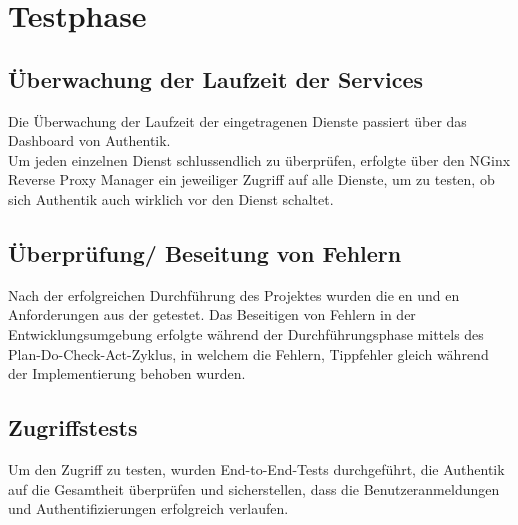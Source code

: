 \section{Testphase}
\label{sec:Testphase}

\subsection{Überwachung der Laufzeit der Services}
\label{sec:Überwachung der Laufzeit der Services}
Die Überwachung der Laufzeit der eingetragenen Dienste passiert über das Dashboard von Authentik.
\\Um jeden einzelnen Dienst schlussendlich zu überprüfen, erfolgte über den NGinx Reverse Proxy Manager ein jeweiliger Zugriff auf alle Dienste, um 
zu testen, ob sich Authentik auch wirklich vor den Dienst schaltet.

\subsection{Überprüfung/ Beseitung von Fehlern}
\label{sec:Überprüfung/ Beseitung von Fehlern}
Nach der erfolgreichen Durchführung des Projektes wurden die en und en Anforderungen aus der 
 getestet. Das Beseitigen von Fehlern in der Entwicklungsumgebung erfolgte während der Durchführungsphase 
mittels des Plan-Do-Check-Act-Zyklus, in welchem die Fehlern, \zB Tippfehler gleich während der Implementierung behoben wurden.


\subsection{Zugriffstests}
\label{sec:Zugriffstests}
Um den Zugriff zu testen, wurden End-to-End-Tests durchgeführt, die Authentik auf die Gesamtheit überprüfen und 
sicherstellen, dass die Benutzeranmeldungen und Authentifizierungen erfolgreich verlaufen.